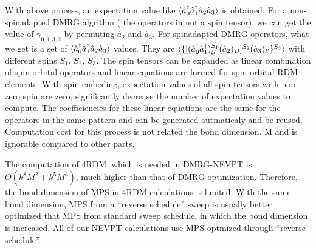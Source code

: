 
With above process, an expectation value like $\braket{\hat{a}^\dagger_0\hat{a}^\dagger_1\hat{a}_2\hat{a}_3}$ is obtained. For a non-spinadapted DMRG algrithm ( the operators in not a spin tensor), we can get the value of $\gamma_{0,1,3,2}$ by permuting $ \hat{a}_2$ and $\hat{a}_3$. For spinadapted DMRG operators, what we get is a set of $\braket{\hat{a}^\dagger_0\hat{a}^\dagger_1\hat{a}_2\hat{a}_3}$  values. They are $\braket{\{[(\hat{a}^\dagger_0\hat{a}^\dagger_1)^{S_1}_{\mathcal{S}}(\hat{a}_2)_{\mathcal{D}}]^{S_2}(\hat{a}_3)_{\mathcal{E}}\}^{S_3}}$ with different spins $S_1$, $S_2$, $S_3$. The spin tensors can be expanded as linear combination of spin orbital operators and linear equations are formed for spin orbital RDM elements. With spin embeding, expectation values of all spin tensors with non-zero spin are zero, significantly decrease the number of expectation values to compute. The coefficiencies for these linear equations are the same for the operators in the same pattern and can be generated autmaticaly and be reused. Computation cost for this process is not related the bond dimension, M and is ignorable compared to other parts.

The computation of 4RDM, which is needed in DMRG-NEVPT is $O(k^8M^2+k^5M^3)$, much higher than that of DMRG optimization. Therefore, the bond dimension of MPS in 4RDM calculations is limited. With the same bond dimension, MPS from a ``reverse schedule'' sweep is usually better optimized that MPS from standard sweep schedule, in which the bond dimension is increased. All of our NEVPT calculations use MPS optmized through ``reverse schedule''.

